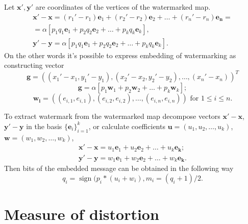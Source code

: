 \documentclass{article}
\newcommand{\sgn}{\operatorname{sign}}
\begin{document}
Let $\mathbf{x'}, \mathbf{y'}$ are coordinates of the vertices of the watermarked map. 
\begin{eqnarray*}
  \mathbf{x'} - \mathbf{x} = (r_1' - r_1) \mathbf{e}_1 + (r_2' - r_2) \mathbf{e}_2 + \dots + (r_n' - r_n) \mathbf{e_n} = \\
  = \alpha \left[ p_1 q_1 \mathbf{e}_1 + p_2 q_2 \mathbf{e}_2 + \dots + p_k q_k \mathbf{e}_k \right], \\
  \mathbf{y'} - \mathbf{y} = \alpha \left[ p_1 q_1 \mathbf{e}_1 + p_2 q_2 \mathbf{e}_2 + \dots + p_k q_k \mathbf{e}_k \right]. 
\end{eqnarray*}
On the other words it's possible to express embedding of watermarking as constructing vector 
\begin{equation}
\label{formula:g}
  \mathbf{g} = \left((x_1' - x_1, y_1' - y_1), (x_2' - x_2, y_2' - y_2), \dots, (x_n' - x_n) \right)^T 
\end{equation}
$$ \mathbf{g} = \alpha \left[ p_1 \mathbf{w}_1 + p_2 \mathbf{w}_2 + \dots + p_k \mathbf{w}_k \right]; $$
$$ \mathbf{w_i} = \left( (e_{i, 1}, e_{i, 1}), (e_{i, 2}, e_{i, 2}), \dots, (e_{i, n}, e_{i, n}) \right) \mbox{ for } 1 \le i \le n. $$

To extract watermark from the watermarked map decompose vectors $\mathbf{x'} - \mathbf{x}$, $\mathbf{y'} - \mathbf{y}$ in the basis $\{\mathbf{e}_i\}_{i=1}^k$, or calculate coefficients 
$\mathbf{u} = (u_1, u_2, \dots, u_k)$, $\mathbf{w} = (w_1, w_2, \dots, w_k)$, 
\begin{eqnarray*}
  \mathbf{x'} - \mathbf{x} = u_1 \mathbf{e}_1 + u_2 \mathbf{e}_2 + \dots + u_k \mathbf{e_k}; \\ 
  \mathbf{y'} - \mathbf{y} = w_1 \mathbf{e}_1 + w_2 \mathbf{e}_2 + \dots + w_k \mathbf{e_k}.  
\end{eqnarray*}
Then bits of the embedded message can be obtained in the following way
$$q_i = \sgn(p_i * (u_i + w_i), m_i = (q_i + 1) / 2.$$

\section{Measure of distortion} 
\label{sec:dist_measure}
\end{document}
